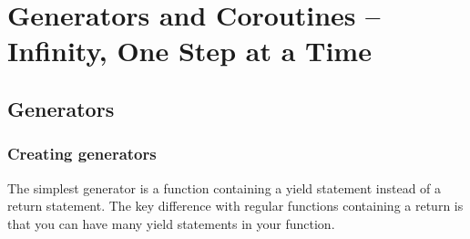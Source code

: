 \chapter{Generators and Coroutines – Infinity, One Step at a Time\label{ch07}}
\section{Generators}
\subsection{Creating generators}
The simplest generator is a function containing a yield statement instead of a return statement. The key difference with regular functions containing a return is that you can have many yield statements in your function.